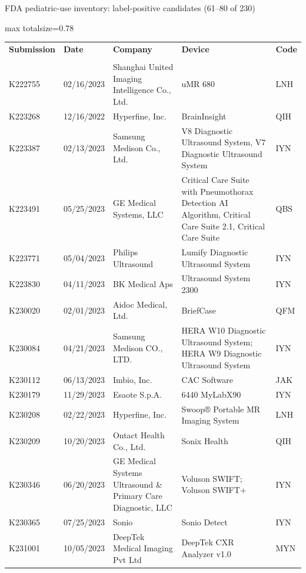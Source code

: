 \documentclass[aspectratio=169]{beamer}
\renewcommand{\arraystretch}{1.08}
\begin{document}
\begin{frame}[category=FDA appendix]{FDA pediatric-use inventory: label-positive candidates (61--80 of 230)}
\begin{adjustbox}{max totalsize={\textwidth}{0.78\textheight}}
\renewcommand{\arraystretch}{1.2}
\begin{tabular}{|p{}|p{}|p{}|p{}|p{}|}
\hline \textbf{Submission} & \textbf{Date} & \textbf{Company} & \textbf{Device} & \textbf{Code} \\\\ \hline
K222755 & 02/16/2023 & Shanghai United Imaging Intelligence Co., Ltd. & uMR 680 & LNH \\ \hline
K223268 & 12/16/2022 & Hyperfine, Inc. & BrainInsight & QIH \\ \hline
K223387 & 02/13/2023 & Samsung Medison Co., Ltd. & V8 Diagnostic Ultrasound System, V7 Diagnostic Ultrasound System & IYN \\ \hline
K223491 & 05/25/2023 & GE Medical Systems, LLC & Critical Care Suite with Pneumothorax Detection AI Algorithm, Critical Care Suite 2.1, Critical Care Suite & QBS \\ \hline
K223771 & 05/04/2023 & Philips Ultrasound & Lumify Diagnostic Ultrasound System & IYN \\ \hline
K223830 & 04/11/2023 & BK Medical Aps & Ultrasound System 2300 & IYN \\ \hline
K230020 & 02/01/2023 & Aidoc Medical, Ltd. & BriefCase & QFM \\ \hline
K230084 & 04/21/2023 & Samsung Medison CO., LTD. & HERA W10 Diagnostic Ultrasound System; HERA W9 Diagnostic Ultrasound System & IYN \\ \hline
K230112 & 06/13/2023 & Imbio, Inc. & CAC Software & JAK \\ \hline
K230179 & 11/29/2023 & Esaote S.p.A. & 6440 MyLabX90 & IYN \\ \hline
K230208 & 02/22/2023 & Hyperfine, Inc. & Swoop® Portable MR Imaging System & LNH \\ \hline
K230209 & 10/20/2023 & Ontact Health Co., Ltd. & Sonix Health & QIH \\ \hline
K230346 & 06/20/2023 & GE Medical Systems Ultrasound \& Primary Care Diagnostic, LLC & Voluson SWIFT; Voluson SWIFT+ & IYN \\ \hline
K230365 & 07/25/2023 & Sonio & Sonio Detect & IYN \\ \hline
K231001 & 10/05/2023 & DeepTek Medical Imaging Pvt Ltd & DeepTek CXR Analyzer v1.0 & MYN \\ \hline

\end{tabular}
\end{adjustbox}
\end{frame}
\end{document}
